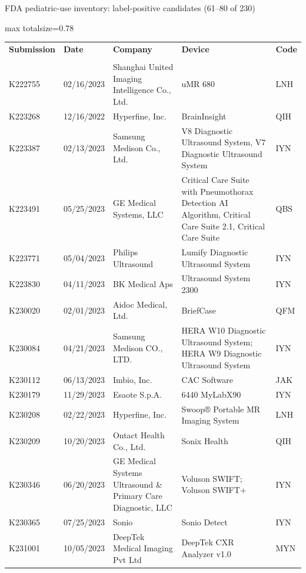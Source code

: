 \documentclass[aspectratio=169]{beamer}
\renewcommand{\arraystretch}{1.08}
\begin{document}
\begin{frame}[category=FDA appendix]{FDA pediatric-use inventory: label-positive candidates (61--80 of 230)}
\begin{adjustbox}{max totalsize={\textwidth}{0.78\textheight}}
\renewcommand{\arraystretch}{1.2}
\begin{tabular}{|p{}|p{}|p{}|p{}|p{}|}
\hline \textbf{Submission} & \textbf{Date} & \textbf{Company} & \textbf{Device} & \textbf{Code} \\\\ \hline
K222755 & 02/16/2023 & Shanghai United Imaging Intelligence Co., Ltd. & uMR 680 & LNH \\ \hline
K223268 & 12/16/2022 & Hyperfine, Inc. & BrainInsight & QIH \\ \hline
K223387 & 02/13/2023 & Samsung Medison Co., Ltd. & V8 Diagnostic Ultrasound System, V7 Diagnostic Ultrasound System & IYN \\ \hline
K223491 & 05/25/2023 & GE Medical Systems, LLC & Critical Care Suite with Pneumothorax Detection AI Algorithm, Critical Care Suite 2.1, Critical Care Suite & QBS \\ \hline
K223771 & 05/04/2023 & Philips Ultrasound & Lumify Diagnostic Ultrasound System & IYN \\ \hline
K223830 & 04/11/2023 & BK Medical Aps & Ultrasound System 2300 & IYN \\ \hline
K230020 & 02/01/2023 & Aidoc Medical, Ltd. & BriefCase & QFM \\ \hline
K230084 & 04/21/2023 & Samsung Medison CO., LTD. & HERA W10 Diagnostic Ultrasound System; HERA W9 Diagnostic Ultrasound System & IYN \\ \hline
K230112 & 06/13/2023 & Imbio, Inc. & CAC Software & JAK \\ \hline
K230179 & 11/29/2023 & Esaote S.p.A. & 6440 MyLabX90 & IYN \\ \hline
K230208 & 02/22/2023 & Hyperfine, Inc. & Swoop® Portable MR Imaging System & LNH \\ \hline
K230209 & 10/20/2023 & Ontact Health Co., Ltd. & Sonix Health & QIH \\ \hline
K230346 & 06/20/2023 & GE Medical Systems Ultrasound \& Primary Care Diagnostic, LLC & Voluson SWIFT; Voluson SWIFT+ & IYN \\ \hline
K230365 & 07/25/2023 & Sonio & Sonio Detect & IYN \\ \hline
K231001 & 10/05/2023 & DeepTek Medical Imaging Pvt Ltd & DeepTek CXR Analyzer v1.0 & MYN \\ \hline

\end{tabular}
\end{adjustbox}
\end{frame}
\end{document}
